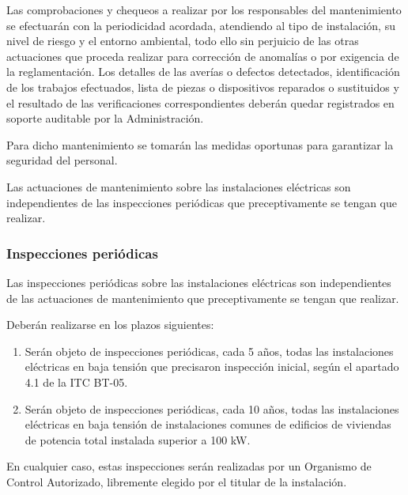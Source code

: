 \documentclass[../main.tex]{subfiles}
\begin{document}
\vspace{0.5 cm}
Las comprobaciones y chequeos a realizar por los responsables del mantenimiento se efectuarán con la periodicidad acordada, atendiendo al tipo de instalación, su nivel de riesgo y el entorno ambiental, todo ello sin perjuicio de las otras actuaciones que proceda realizar para corrección de anomalías o por exigencia de la reglamentación. Los detalles de las averías o defectos detectados, identificación de los trabajos efectuados, lista de piezas o dispositivos reparados o sustituidos y el resultado de las verificaciones correspondientes deberán quedar registrados en soporte auditable por la Administración. \par
\vspace{0.5 cm}
Para dicho mantenimiento se tomarán las medidas oportunas para garantizar la seguridad del personal. \par
\vspace{0.5 cm}
Las actuaciones de mantenimiento sobre las instalaciones eléctricas son independientes de las inspecciones periódicas que preceptivamente se tengan que realizar.

\subsubsection{Inspecciones periódicas}
Las inspecciones periódicas sobre las instalaciones eléctricas son independientes de las actuaciones de mantenimiento que preceptivamente se tengan que realizar. \par
\vspace{0.5 cm}
Deberán realizarse en los plazos siguientes:
\begin{enumerate}
    \item Serán objeto de inspecciones periódicas, cada 5 años, todas las instalaciones eléctricas en baja tensión que precisaron inspección inicial, según el apartado 4.1 de la ITC BT-05.
    \item Serán objeto de inspecciones periódicas, cada 10 años, todas las instalaciones eléctricas en baja tensión de instalaciones comunes de edificios de viviendas de potencia total instalada superior a 100 kW.
\end{enumerate}
En cualquier caso, estas inspecciones serán realizadas por un Organismo de Control Autorizado, libremente elegido por el titular de la instalación.


\end{document}
